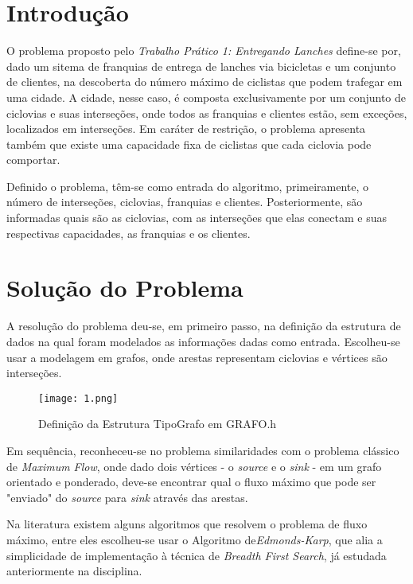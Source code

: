 \documentclass[
    12pt,               %
    a4paper,            %
    oneside,
    english,            %
    french,             %
    spanish,            %
    brazil              %
    ]{abntex2}
\begin{document}
\frenchspacing 
\imprimircapa
\imprimirfolhaderosto*

\textual

\section*{Introdução}

	O problema proposto pelo \textit{Trabalho Prático 1: Entregando Lanches} define-se por, dado um sitema de franquias de entrega de lanches via bicicletas e um conjunto de clientes, na descoberta do número máximo de ciclistas que podem trafegar em uma cidade. A cidade, nesse caso, é composta exclusivamente por um conjunto de ciclovias e suas interseções, onde todos as franquias e clientes estão, sem exceções, localizados em interseções. Em caráter de restrição, o problema apresenta também que existe uma capacidade fixa de ciclistas que cada ciclovia pode comportar.
	
	Definido o problema, têm-se como entrada do algoritmo, primeiramente, o número de interseções, ciclovias, franquias e clientes. Posteriormente, são informadas quais são as ciclovias, com as interseções que elas conectam e suas respectivas capacidades, as franquias e os clientes.
	
\section*{Solução do Problema}

	A resolução do problema deu-se, em primeiro passo, na definição da estrutura de dados na qual foram modelados as informações dadas como entrada. Escolheu-se usar a modelagem em grafos, onde arestas representam ciclovias e vértices são interseções.
	
\begin{figure}[!htb]
\centering
\texttt{[image: 1.png]}
\caption{Definição da Estrutura TipoGrafo em GRAFO.h}
\end{figure}
	
	Em sequência, reconheceu-se no problema similaridades com o problema clássico de \textit{Maximum Flow}, onde dado dois vértices - o \textit{source} e o \textit{sink} - em um grafo orientado e ponderado, deve-se encontrar qual o fluxo máximo que pode ser "enviado" do \textit{source} para \textit{sink} através das arestas. 
	
	Na literatura existem alguns algoritmos que resolvem o problema de fluxo máximo, entre eles escolheu-se usar o Algoritmo de\textit{Edmonds-Karp}, que alia a simplicidade de implementação à técnica de \textit{Breadth First Search}, já estudada anteriormente na disciplina.
	
\end{document}
